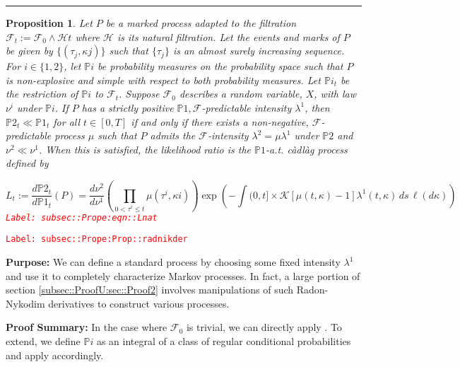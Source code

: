 \documentclass[12pt]{article}
\newcommand{\mb}{\mathbb}
\newcommand{\mc}{\mathcal}
\newcommand{\tr}{\textcolor{red}}
\newcommand{\labe}[1]{\tr{\texttt{Label: #1}}}
\newcommand{\purpose}{\textbf{Purpose: }}
\newcommand{\pfsum}{\textbf{Proof Summary: }}
\newcommand{\lin}{\rule{\linewidth}{0.4 pt}}
\newcommand{\pr}{\mb{P}}							%
\renewcommand{\t}{t}							%
\newcommand{\F}{\mc{F}}							%
\newcommand{\FH}{\mc{H}}						%
\newcommand{\X}{X}								%
\newcommand{\ts}[1]{_{#1}}						%
\newcommand{\rate}{\lambda}						%
\newcommand{\indx}[1]{_{#1}}					%
\newcommand{\m}{\mu}							%
\newcommand{\mm}{\nu}							%
\newcommand{\rt}{\tau}							%
\renewcommand{\mark}{\kappa}					%
\newcommand{\rp}{P}								%
\newcommand{\mspce}{\mc{K}}						%
\newtheorem{prop}[thms]{Proposition}
\begin{document}
\lin

\begin{prop}
Let \(\rp\) be a marked process adapted to the filtration \(\F\ts{\t} := \F\ts{0}\wedge \FH{\t}\) where \(\FH\) is its natural filtration. Let the events and marks of \(\rp\) be given by \(\{(\rt\indx{j},\mark{j})\}\) such that \(\{\rt\indx{j}\}\) is an almost surely increasing sequence. For \(i \in \{1,2\}\), let \(\pr{i}\) be probability measures on the probability space such that \(\rp\) is non-explosive and simple with respect to both probability measures. Let \(\pr{i}_\t\) be the restriction of \(\pr{i}\) to \(\F\ts{\t}\). Suppose \(\F\ts{0}\) describes a random variable, \(\X\), with law \(\mm^i\) under \(\pr{i}\). If \(\rp\) has a strictly positive \(\pr{1},\F\)-predictable intensity \(\rate^1\), then \(\pr{2}_\t \ll \pr{1}_\t\) for all \(\t \in [0,T]\) if and only if there exists a non-negative, \(\F\)-predictable process \(\m\) such that \(\rp\) admits the \(\F\)-intensity \(\rate^2 = \m\rate^1\) under \(\pr{2}\) and \(\mm^2 \ll \mm^1\). When this is satisfied, the likelihood ratio is the \(\pr{1}\)-a.t. c\`adl\`ag process defined by 

\begin{equation}
L_\t:= \frac{d\pr{2}_\t}{d\pr{1}_\t}(\rp) = \frac{d\mm^2}{d\mm^1}\left(\prod_{0<\rt^i\leq \t} \m(\rt^i,\mark{i})\right)\exp\left(-\int{(0,\t]\times \mspce}[\m(\t,\mark) - 1]\rate^1(\t,\mark)\,ds\,\ell(d\mark)\right)
\label{subsec::Prope:eqn::Lnat}
\end{equation}
\labe{subsec::Prope:eqn::Lnat}
\label{subsec::Prope:Prop::radnikder}
\end{prop}
\labe{subsec::Prope:Prop::radnikder}

\purpose We can define a standard process by choosing some fixed intensity \(\rate^1\) and use it to completely characterize Markov processes. In fact, a large portion of section \ref{subsec::ProofU:sec::Proof2} involves manipulations of such Radon-Nykodim derivatives to construct various processes.

\pfsum In the case where \(\F\ts{0}\) is trivial, we can directly apply \cite[Theorem 14.4.I]{DalVer08}. To extend, we define \(\pr{i}\) as an integral of a class of regular conditional probabilities and apply \cite[Theorem 14.4.I]{DalVer08} accordingly.
\end{document}
